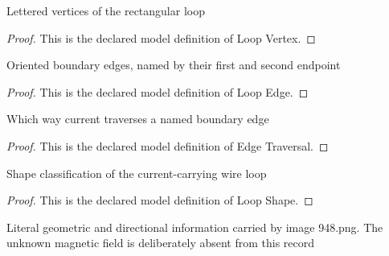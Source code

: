 \begin{definition}
  \label{def:physics:phyx-mini-0948:phyxminiproblems-problemphyxmini0948-loopvertex}
  Lettered vertices of the rectangular loop
\end{definition}
\begin{proof}
  This is the declared model definition of Loop Vertex.
\end{proof}
\begin{definition}
  \label{def:physics:phyx-mini-0948:phyxminiproblems-problemphyxmini0948-loopedge}
  Oriented boundary edges, named by their first and second endpoint
\end{definition}
\begin{proof}
  This is the declared model definition of Loop Edge.
\end{proof}
\begin{definition}
  \label{def:physics:phyx-mini-0948:phyxminiproblems-problemphyxmini0948-edgetraversal}
  Which way current traverses a named boundary edge
\end{definition}
\begin{proof}
  This is the declared model definition of Edge Traversal.
\end{proof}
\begin{definition}
  \label{def:physics:phyx-mini-0948:phyxminiproblems-problemphyxmini0948-loopshape}
  Shape classification of the current-carrying wire loop
\end{definition}
\begin{proof}
  This is the declared model definition of Loop Shape.
\end{proof}
\begin{definition}
  \label{def:physics:phyx-mini-0948:phyxminiproblems-problemphyxmini0948-rectangularloopfigure}
  Literal geometric and directional information carried by image 948.png. The unknown magnetic field is deliberately absent from this record
\end{definition}
